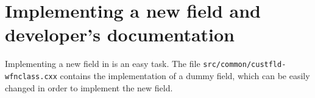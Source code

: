 
\chapter{Implementing a new field and developer's documentation}

Implementing a new field in \DTK{} is an easy task. The file \texttt{src/\-com\-mon/\-cust\-fld-wfn\-class.\-cxx}
contains the implementation of a dummy field, which can be easily changed in order to implement
the new field.

